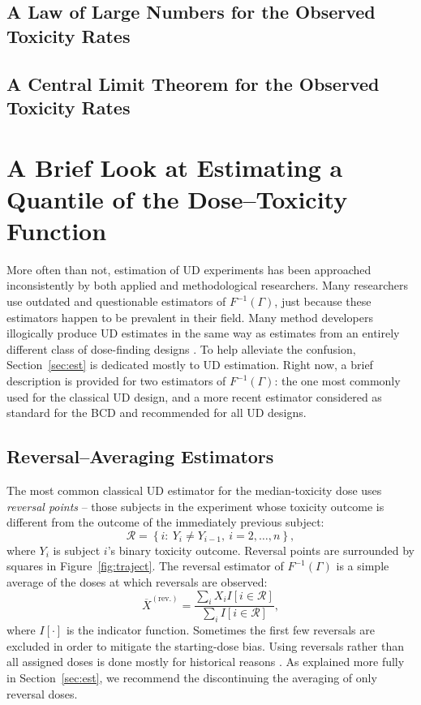 \subsection{A Law of Large Numbers for the Observed Toxicity Rates}

\subsection{A Central Limit Theorem for the Observed Toxicity Rates}

\section{A Brief Look at Estimating a Quantile of the Dose--Toxicity Function}

More often than not, estimation of UD experiments has been approached inconsistently by both applied and methodological researchers. Many researchers use outdated and questionable estimators of $F^{-1}(\Gamma)$, just because these estimators happen to be prevalent in their field. Many method developers illogically produce  UD estimates  in the same way as estimates from an entirely different class of dose-finding designs \cite[e.g.,][]{Zack:stag:2009}. To help alleviate the confusion, Section~\ref{sec:est} is dedicated mostly to UD estimation. Right now, a brief description is provided for two  estimators of $F^{-1}(\Gamma)$: the one most commonly used for the classical UD design, and a more recent estimator considered as standard for the BCD and recommended for all UD designs.

\subsection{Reversal--Averaging Estimators}

The most common classical UD estimator for the median-toxicity dose uses \emph{reversal points} -- those subjects in the experiment whose toxicity outcome is different from the outcome of the immediately previous subject:
%
\begin{equation}\label{eq:reversal}
\mathcal{R}=\left\{i:\ Y_i\neq Y_{i-1},\ i=2,\ldots ,n\right\},
\end{equation}
where $Y_i$ is subject $i$'s binary toxicity outcome. Reversal points are surrounded by squares in Figure~\ref{fig:traject}. The reversal estimator of $F^{-1}(\Gamma)$ is a simple average of the doses at which reversals are observed:
\begin{equation}\label{eq:reversav}
\overline{X}^{\mathrm{(rev.)}}=\frac{\sum_iX_iI\left[i\in\mathcal{R}\right]}{\sum_iI\left[i\in\mathcal{R}\right]},
\end{equation}
\noindent where $I[\cdot]$ is the indicator function. Sometimes the first few reversals are excluded in order to mitigate the starting-dose bias. Using reversals rather than all assigned doses is done mostly for historical reasons \citep{Weth:Chen:Vasu:est:1966}. As explained more fully in Section~\ref{sec:est}, we recommend the discontinuing  the averaging of only reversal doses.

